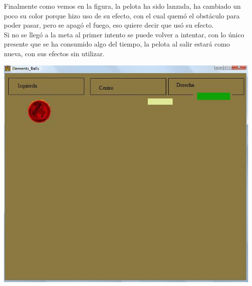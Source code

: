 \documentclass[10pt]{article}
\begin{document}
{\begin{flushleft}
\newpage
Finalmente como vemos en la figura, la pelota ha sido lanzada, ha cambiado un poco su color porque hizo uso de su efecto, con el cual quem\'o el obst\'aculo para poder pasar, pero se apag\'o el fuego, eso quiere decir que us\'o su efecto.\\
Si no se lleg\'o a la meta al primer intento se puede volver a intentar, con lo \'unico presente que se ha consumido algo del tiempo, la pelota al salir estar\'a como nueva, con sus efectos sin utilizar.
\begin{center}
\includegraphics[scale=0.4]{jugar2}
\end{center}


\end{flushleft}}
\end{document}
